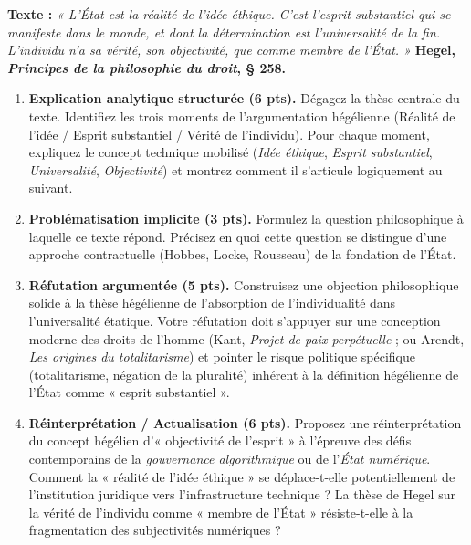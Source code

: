 \documentclass[11pt]{article}
\begin{document}
\begin{exercice}
\textbf{Texte :} \textit{« L'État est la réalité de l'idée éthique. C'est l'esprit substantiel qui se manifeste dans le monde, et dont la détermination est l'universalité de la fin. L'individu n'a sa vérité, son objectivité, que comme membre de l'État. »} \hfill \textbf{Hegel, \textit{Principes de la philosophie du droit}, § 258.}

\begin{enumerate}
    \item \textbf{Explication analytique structurée (6 pts).} Dégagez la thèse centrale du texte. Identifiez les trois moments de l'argumentation hégélienne (Réalité de l'idée / Esprit substantiel / Vérité de l'individu). Pour chaque moment, expliquez le concept technique mobilisé (\textit{Idée éthique}, \textit{Esprit substantiel}, \textit{Universalité}, \textit{Objectivité}) et montrez comment il s'articule logiquement au suivant.
    \item \textbf{Problématisation implicite (3 pts).} Formulez la question philosophique à laquelle ce texte répond. Précisez en quoi cette question se distingue d'une approche contractuelle (Hobbes, Locke, Rousseau) de la fondation de l'État.
    \item \textbf{Réfutation argumentée (5 pts).} Construisez une objection philosophique solide à la thèse hégélienne de l'absorption de l'individualité dans l'universalité étatique. Votre réfutation doit s'appuyer sur une conception moderne des droits de l'homme (Kant, \textit{Projet de paix perpétuelle} ; ou Arendt, \textit{Les origines du totalitarisme}) et pointer le risque politique spécifique (totalitarisme, négation de la pluralité) inhérent à la définition hégélienne de l'État comme « esprit substantiel ».
    \item \textbf{Réinterprétation / Actualisation (6 pts).} Proposez une réinterprétation du concept hégélien d'« objectivité de l'esprit » à l'épreuve des défis contemporains de la \textit{gouvernance algorithmique} ou de l'\textit{État numérique}. Comment la « réalité de l'idée éthique » se déplace-t-elle potentiellement de l'institution juridique vers l'infrastructure technique ? La thèse de Hegel sur la vérité de l'individu comme « membre de l'État » résiste-t-elle à la fragmentation des subjectivités numériques ?
\end{enumerate}
\end{exercice}
\end{document}
